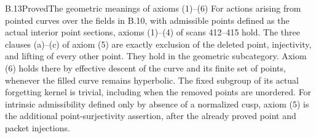 \begin{statement}{B.13}{Proved}{The geometric meanings of axioms (1)--(6)}
For actions arising from pointed curves over the fields in B.10,
with admissible points defined as the actual interior point sections,
axioms (1)--(4) of scans 412--415 hold.  The three clauses (a)--(c) of
axiom (5) are exactly exclusion of the deleted point, injectivity,
and lifting of every other point.  They hold in the geometric
subcategory.  Axiom (6) holds there by effective descent of the
curve and its finite set of points, whenever the filled curve remains
hyperbolic.  The fixed subgroup of its actual forgetting kernel is
trivial, including when the removed points are unordered.  For
intrinsic admissibility defined only by absence of a
normalized cusp, axiom (5) is the additional point-surjectivity
assertion, after the already proved point and packet injections.
\end{statement}
